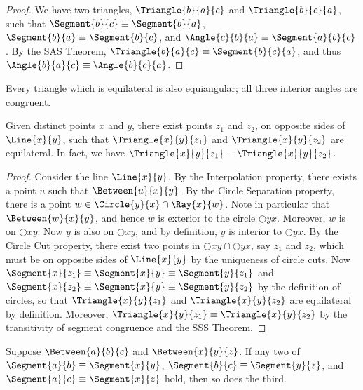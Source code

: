 \documentclass{article}
\begin{document}
\begin{proof}
We have two triangles, $\Triangle{b}{a}{c}$ and $\Triangle{b}{c}{a}$, such that $\Segment{b}{c}\equiv \Segment{b}{a}$, $\Segment{b}{a} \equiv \Segment{b}{c}$, and $\Angle{c}{b}{a} \equiv \Segment{a}{b}{c}$. By the SAS Theorem, $\Triangle{b}{a}{c} \equiv \Segment{b}{c}{a}$, and thus $\Angle{b}{a}{c} \equiv \Angle{b}{c}{a}$.
\end{proof}

\begin{cor}
Every triangle which is equilateral is also equiangular; all three interior angles are congruent.
\end{cor}

\begin{construct}
Given distinct points $x$ and $y$, there exist points $z_1$ and $z_2$, on opposite sides of $\Line{x}{y}$, such that $\Triangle{x}{y}{z_1}$ and $\Triangle{x}{y}{z_2}$ are equilateral. In fact, we have $\Triangle{x}{y}{z_1} \equiv \Triangle{x}{y}{z_2}$.
\end{construct}

\begin{proof}
Consider the line $\Line{x}{y}$. By the Interpolation property, there exists a point $u$ such that $\Between{u}{x}{y}$. By the Circle Separation property, there is a point $w \in \Circle{y}{x} \cap \Ray{x}{w}$. Note in particular that $\Between{w}{x}{y}$, and hence $w$ is exterior to the circle $\Circle{y}{x}$. Moreover, $w$ is on $\Circle{x}{y}$. Now $y$ is also on $\Circle{x}{y}$, and by definition, $y$ is interior to $\Circle{y}{x}$. By the Circle Cut property, there exist two points in $\Circle{x}{y} \cap \Circle{y}{x}$, say $z_1$ and $z_2$, which must be on opposite sides of $\Line{x}{y}$ by the uniqueness of circle cuts. Now $\Segment{x}{z_1} \equiv \Segment{x}{y} \equiv \Segment{y}{z_1}$ and $\Segment{x}{z_2} \equiv \Segment{x}{y} \equiv \Segment{y}{z_2}$ by the definition of circles, so that $\Triangle{x}{y}{z_1}$ and $\Triangle{x}{y}{z_2}$ are equilateral by definition. Moreover, $\Triangle{x}{y}{z_1} \equiv \Triangle{x}{y}{z_2}$ by the transitivity of segment congruence and the SSS Theorem.
\end{proof}

\begin{prop}
Suppose $\Between{a}{b}{c}$ and $\Between{x}{y}{z}$. If any two of $\Segment{a}{b} \equiv \Segment{x}{y}$, $\Segment{b}{c} \equiv \Segment{y}{z}$, and $\Segment{a}{c} \equiv \Segment{x}{z}$ hold, then so does the third.
\end{prop}
\end{document}

